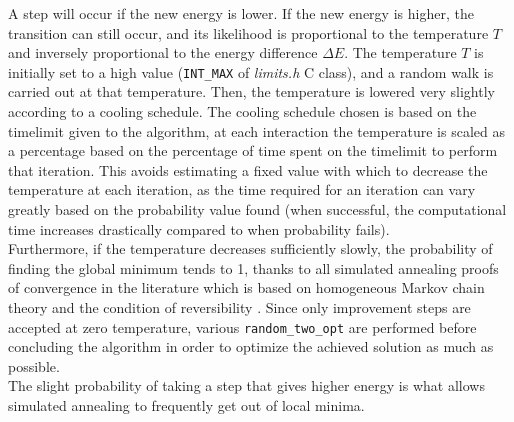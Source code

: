 A step will occur if the new energy is lower. If the new energy is higher, the transition can still occur, and its likelihood is proportional to the temperature $T$ and inversely proportional to the energy difference $\Delta E$.
The temperature $T$ is initially set to a high value (\texttt{INT\_MAX} of \textit{limits.h} C class), and a random walk is carried out at that temperature. Then, the temperature is lowered very slightly according to a cooling schedule.
The cooling schedule chosen is based on the timelimit given to the algorithm, at each interaction the temperature is scaled as a percentage based on the percentage of time spent on the timelimit to perform that iteration. This avoids estimating a fixed value with which to decrease the temperature at each iteration, as the time required for an iteration can vary greatly based on the probability value found (when successful, the computational time increases drastically compared to when probability fails).\\
Furthermore, if the temperature decreases sufficiently slowly, the probability of finding the global minimum tends to 1, thanks to all simulated annealing proofs of convergence in the literature which is based on homogeneous Markov chain theory and the condition of reversibility \cite{Henderson}. Since only improvement steps are accepted at zero temperature, various \texttt{random\_two\_opt} are performed before concluding the algorithm in order to optimize the achieved solution as much as possible.\\
The slight probability of taking a step that gives higher energy is what allows simulated annealing to frequently get out of local minima.

